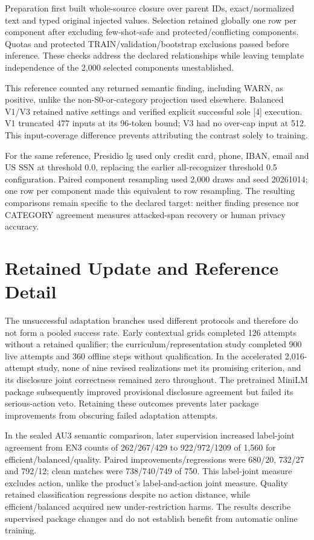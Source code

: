 \documentclass[conference]{IEEEtran}
\begin{document}
Preparation first built whole-source closure over parent IDs, exact/normalized text and typed original injected values. Selection retained globally one row per component after excluding few-shot-safe and protected/conflicting components. Quotas and protected TRAIN/validation/bootstrap exclusions passed before inference. These checks address the declared relationships while leaving template independence of the 2,000 selected components unestablished.

This reference counted any returned semantic finding, including WARN, as positive, unlike the non-S0-or-category projection used elsewhere. Balanced V1/V3 retained native settings and verified explicit successful sole [4] execution. V1 truncated 477 inputs at its 96-token bound; V3 had no over-cap input at 512. This input-coverage difference prevents attributing the contrast solely to training.

For the same reference, Presidio lg used only credit card, phone, IBAN, email and US SSN at threshold 0.0, replacing the earlier all-recognizer threshold 0.5 configuration. Paired component resampling used 2,000 draws and seed 20261014; one row per component made this equivalent to row resampling. The resulting comparisons remain specific to the declared target: neither finding presence nor CATEGORY agreement measures attacked-span recovery or human privacy accuracy.

\section{Retained Update and Reference Detail}
\label{app:history}\label{app:reference_detail}
The unsuccessful adaptation branches used different protocols and therefore do not form a pooled success rate. Early contextual grids completed 126 attempts without a retained qualifier; the curriculum/representation study completed 900 live attempts and 360 offline steps without qualification. In the accelerated 2,016-attempt study, none of nine revised realizations met its promising criterion, and its disclosure joint correctness remained zero throughout. The pretrained MiniLM package subsequently improved provisional disclosure agreement but failed its serious-action veto. Retaining these outcomes prevents later package improvements from obscuring failed adaptation attempts.

In the sealed AU3 semantic comparison, later supervision increased label-joint agreement from EN3 counts of 262/267/429 to 922/972/1209 of 1,560 for efficient/balanced/quality. Paired improvements/regressions were 680/20, 732/27 and 792/12; clean matches were 738/740/749 of 750. This label-joint measure excludes action, unlike the product's label-and-action joint measure. Quality retained classification regressions despite no action distance, while efficient/balanced acquired new under-restriction harms. The results describe supervised package changes and do not establish benefit from automatic online training.
\end{document}
